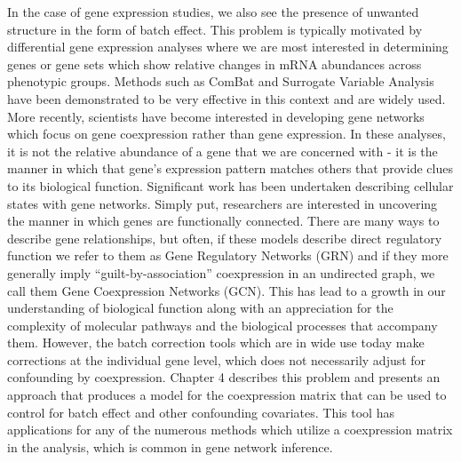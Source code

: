 In the case of gene expression studies, we also see the presence of unwanted structure in the form of batch effect.  This problem is typically motivated by differential gene expression analyses where we are most interested in determining genes or gene sets which show relative changes in mRNA abundances across phenotypic groups. Methods such as ComBat and Surrogate Variable Analysis have been demonstrated to be very effective in this context and are widely used. More recently, scientists have become interested in developing gene networks which focus on gene coexpression rather than gene expression. In these analyses, it is not the relative abundance of a gene that we are concerned with - it is the manner in which that gene's expression pattern matches others that provide clues to its biological function. Significant work has been undertaken describing cellular states with gene networks. Simply put, researchers are interested in uncovering the manner in which genes are functionally connected. There are many ways to describe gene relationships, but often, if these models describe direct regulatory function we refer to them as Gene Regulatory Networks (GRN) and if they more generally imply ``guilt-by-association'' coexpression in an undirected graph, we call them Gene Coexpression Networks (GCN). This has lead to a growth in our understanding of biological function along with an appreciation for the complexity of molecular pathways and the biological processes that accompany them. However, the batch correction tools which are in wide use today make corrections at the individual gene level, which does not necessarily adjust for confounding by coexpression. Chapter 4 describes this problem and presents an approach that produces a model for the coexpression matrix that can be used to control for batch effect and other confounding covariates.  This tool has applications for any of the numerous methods which utilize a coexpression matrix in the analysis, which is common in gene network inference.

